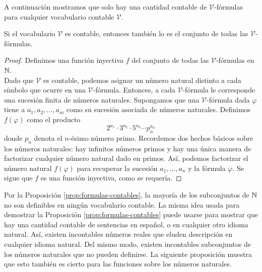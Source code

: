 \message{ !name(main.tex)}\documentclass[12pt,a4paper]{book}
\newcommand{\VV}{\mathcal{V}}
\begin{document}
    A continuación mostramos que solo hay una cantidad contable de $\VV$-fórmulas para cualquier vocabulario contable $\VV$.

    \begin{proposicion}\label{prop:formulas-contables}
        Si el vocabulario $\VV$ es contable, entonces también lo es el conjunto de todas las $\VV$-fórmulas.
    \end{proposicion}
    \begin{proof}
        Definimos una función inyectiva $f$ del conjunto de todas las $\VV$-fórmulas en $\mathbb{N}$.\\
        Dado que $\VV$ es contable, podemos asignar un número natural distinto a cada símbolo que ocurre en una
        $\VV$-fórmula. Entonces, a cada $\VV$-fórmula le corresponde una sucesión finita de números naturales. Supongamos
        que una $\VV$-fórmula dada $\varphi$ tiene a $a_{1},a_{2},\dots,a_{m}$ como su sucesión asociada de números
        naturales. Definimos $f(\varphi)$ como el producto
        \begin{equation*}
            2^{a_{1}}\cdot 3^{a_{2}}\cdot 5^{a_{3}}\cdots p_{n}^{a_{n}}
        \end{equation*}
        donde $p_{n}$ denota el $n$-ésimo número primo. Recordemos dos hechos básicos sobre los números naturales: hay
        infinitos números primos y hay una única manera de factorizar cualquier número natural dado en primos. Así,
        podemos factorizar el número natural $f(\varphi)$ para recuperar la sucesión $a_{1},\dots,a_{n}$ y la fórmula
        $\varphi$. Se sigue que $f$ es una función inyectiva, como se requería.
    \end{proof}

    Por la Proposición \ref{prop:formulas-contables}, la mayoría de los subconjuntos de $\mathbb{N}$ no son definibles en ningún
    vocabulario contable. La misma idea usada para demostrar la Proposición \ref{prop:formulas-contables} puede usarse
    para mostrar que hay una cantidad contable de sentencias en español, o en cualquier otro idioma natural. Así, existen
    incontables números reales que eluden descripción en cualquier idioma natural. Del mismo modo, existen incontables
    subconjuntos de los números naturales que no pueden definirse. La siguiente proposición muestra que esto también es
    cierto para las funciones sobre los números naturales.
\end{document}
